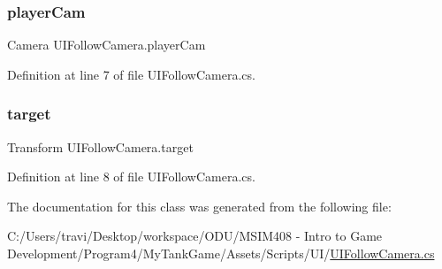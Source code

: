 \subsubsection{\texorpdfstring{player\+Cam}{playerCam}}
{\footnotesize\ttfamily Camera U\+I\+Follow\+Camera.\+player\+Cam}



Definition at line 7 of file U\+I\+Follow\+Camera.\+cs.

\mbox{\label{class_u_i_follow_camera_a286876284df5954c8be56bea0bb075f7}} 
\subsubsection{\texorpdfstring{target}{target}}
{\footnotesize\ttfamily Transform U\+I\+Follow\+Camera.\+target}



Definition at line 8 of file U\+I\+Follow\+Camera.\+cs.



The documentation for this class was generated from the following file\+:\begin{DoxyCompactItemize}
\item 
C\+:/\+Users/travi/\+Desktop/workspace/\+O\+D\+U/\+M\+S\+I\+M408 -\/ Intro to Game Development/\+Program4/\+My\+Tank\+Game/\+Assets/\+Scripts/\+U\+I/\hyperlink{_u_i_follow_camera_8cs}{U\+I\+Follow\+Camera.\+cs}\end{DoxyCompactItemize}
